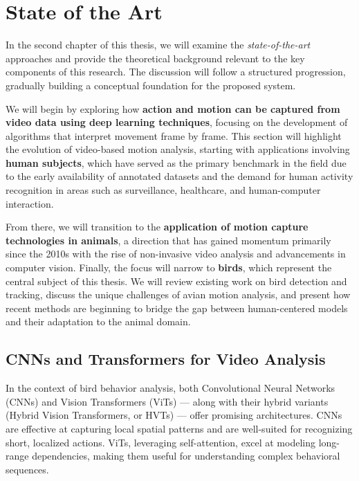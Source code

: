 
\chapter{State of the Art}
\label{marcoteorico}

In the second chapter of this thesis, we will examine the \textit{state-of-the-art} approaches and provide the theoretical background relevant to the key components of this research. The discussion will follow a structured progression, gradually building a conceptual foundation for the proposed system.

We will begin by exploring how \textbf{action and motion can be captured from video data using deep learning techniques}, focusing on the development of algorithms that interpret movement frame by frame. This section will highlight the evolution of video-based motion analysis, starting with applications involving \textbf{human subjects}, which have served as the primary benchmark in the field due to the early availability of annotated datasets and the demand for human activity recognition in areas such as surveillance, healthcare, and human-computer interaction.

From there, we will transition to the \textbf{application of motion capture technologies in animals}, a direction that has gained momentum primarily since the 2010s with the rise of non-invasive video analysis and advancements in computer vision. Finally, the focus will narrow to \textbf{birds}, which represent the central subject of this thesis. We will review existing work on bird detection and tracking, discuss the unique challenges of avian motion analysis, and present how recent methods are beginning to bridge the gap between human-centered models and their adaptation to the animal domain.



\section{CNNs and Transformers for Video Analysis}

In the context of bird behavior analysis, both Convolutional Neural Networks (CNNs) and Vision Transformers (ViTs) — along with their hybrid variants (Hybrid Vision Transformers, or HVTs) — offer promising architectures. CNNs are effective at capturing local spatial patterns and are well-suited for recognizing short, localized actions. ViTs, leveraging self-attention, excel at modeling long-range dependencies, making them useful for understanding complex behavioral sequences.

